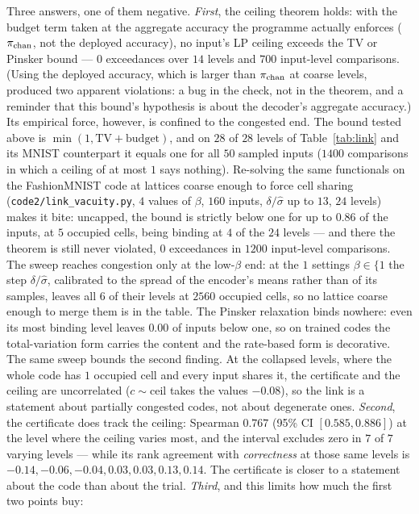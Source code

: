 \documentclass[11pt]{article}
\begin{document}
Three answers, one of them negative. \emph{First}, the ceiling theorem holds: with the budget term
taken at the aggregate accuracy the programme actually enforces ($\pi_{\rm chan}$, not the deployed
accuracy), no input's LP ceiling exceeds the TV or Pinsker bound --- $0$ exceedances over $14$
levels and $700$ input-level comparisons. (Using the deployed accuracy, which is larger than
$\pi_{\rm chan}$ at coarse levels, produced two apparent violations: a bug in the check, not in the
theorem, and a reminder that this bound's hypothesis is about the decoder's aggregate accuracy.) Its empirical force, however, is confined to the congested end. The bound tested above is $\min(1,\mathrm{TV}+\text{budget})$, and on $28$ of $28$ levels of Table~\ref{tab:link} and its MNIST counterpart it equals one for all $50$ sampled inputs ($1400$ comparisons in which a ceiling of at most $1$ says nothing). Re-solving the same functionals on the FashionMNIST code at lattices coarse enough to force cell sharing (\texttt{code2/link\_vacuity.py}, $4$ values of $\beta$, $160$ inputs, $\delta/\hat\sigma$ up to $13$, $24$ levels) makes it bite: uncapped, the bound is strictly below one for up to $0.86$ of the inputs, at $5$ occupied cells, being binding at $4$ of the $24$ levels --- and there the theorem is still never violated, $0$ exceedances in $1200$ input-level comparisons. The sweep reaches congestion only at the low-$\beta$ end: at the $1$ settings $\beta\in\{1$ the step $\delta/\hat\sigma$, calibrated to the spread of the encoder's means rather than of its samples, leaves all $6$ of their levels at $2560$ occupied cells, so no lattice coarse enough to merge them is in the table. The Pinsker relaxation binds nowhere: even its most binding level leaves $0.00$ of inputs below one, so on trained codes the total-variation form carries the content and the rate-based form is decorative. The same sweep bounds the second finding. At the collapsed levels, where the whole code has $1$ occupied cell and every input shares it, the certificate and the ceiling are uncorrelated ($c\!\sim\!\mathrm{ceil}$ takes the values $-0.08$), so the link is a statement about partially congested codes, not about degenerate ones. 
\emph{Second}, the certificate does track the ceiling: Spearman $0.767$
(95\% CI $[0.585,0.886]$) at the level where
the ceiling varies most, and the interval excludes zero in $7$ of $7$
varying levels --- while its rank agreement with \emph{correctness} at those same levels is
$-0.14, -0.06, -0.04, 0.03, 0.03, 0.13, 0.14$. The certificate is closer to a statement about
the code than about the trial. \emph{Third}, and this limits how much the first two points buy:
\end{document}
